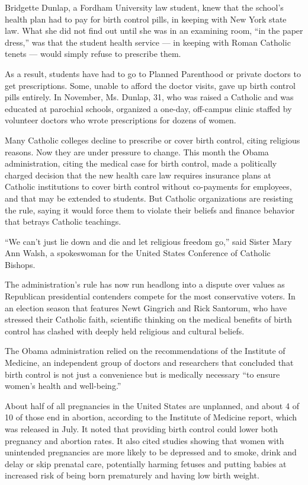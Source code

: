 Bridgette Dunlap, a Fordham University law student, knew that the
school's health plan had to pay for birth control pills, in keeping with
New York state law. What she did not find out until she was in an
examining room, ``in the paper dress,'' was that the student health
service --- in keeping with Roman Catholic tenets --- would simply
refuse to prescribe them.

As a result, students have had to go to Planned Parenthood or private
doctors to get prescriptions. Some, unable to afford the doctor visits,
gave up birth control pills entirely. In November, Ms. Dunlap, 31, who
was raised a Catholic and was educated at parochial schools, organized a
one-day, off-campus clinic staffed by volunteer doctors who wrote
prescriptions for dozens of women.

Many Catholic colleges decline to prescribe or cover birth control,
citing religious reasons. Now they are under pressure to change. This
month the Obama administration, citing the medical case for birth
control, made a politically charged decision that the new health care
law requires insurance plans at Catholic institutions to cover birth
control without co-payments for employees, and that may be extended to
students. But Catholic organizations are resisting the rule, saying it
would force them to violate their beliefs and finance behavior that
betrays Catholic teachings.

``We can't just lie down and die and let religious freedom go,'' said
Sister Mary Ann Walsh, a spokeswoman for the United States Conference of
Catholic Bishops.

The administration's rule has now run headlong into a dispute over
values as Republican presidential contenders compete for the most
conservative voters. In an election season that features Newt Gingrich
and Rick Santorum, who have stressed their Catholic faith, scientific
thinking on the medical benefits of birth control has clashed with
deeply held religious and cultural beliefs.

The Obama administration relied on the recommendations of the Institute
of Medicine, an independent group of doctors and researchers that
concluded that birth control is not just a convenience but is medically
necessary ``to ensure women's health and well-being.''

About half of all pregnancies in the United States are unplanned, and
about 4 of 10 of those end in abortion, according to the Institute of
Medicine report, which was released in July. It noted that providing
birth control could lower both pregnancy and abortion rates. It also
cited studies showing that women with unintended pregnancies are more
likely to be depressed and to smoke, drink and delay or skip prenatal
care, potentially harming fetuses and putting babies at increased risk
of being born prematurely and having low birth weight.

